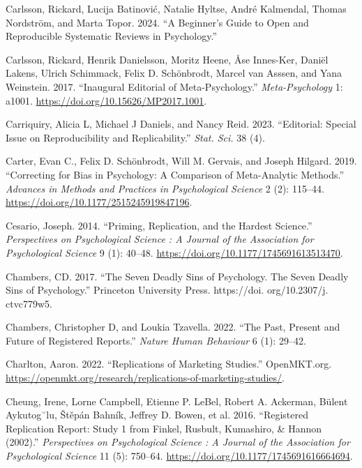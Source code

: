 \documentclass[
  letterpaper,
  DIV=11,
  numbers=noendperiod]{scrreprt}
\newlength{\cslhangindent}
\newenvironment{CSLReferences}[2] %
 {\begin{list}{}{%
  \setlength{\itemindent}{0pt}
  \setlength{\leftmargin}{0pt}
  \setlength{\parsep}{0pt}
  \ifodd #1
   \setlength{\leftmargin}{\cslhangindent}
   \setlength{\itemindent}{-1\cslhangindent}
  \fi
  \setlength{\itemsep}{#2\baselineskip}}}
 {\end{list}}
\begin{document}
\begin{CSLReferences}{1}{0}
Carlsson, Rickard, Lucija Batinović, Natalie Hyltse, André Kalmendal,
Thomas Nordström, and Marta Topor. 2024. {``A Beginner's Guide to Open
and Reproducible Systematic Reviews in Psychology.''}

Carlsson, Rickard, Henrik Danielsson, Moritz Heene, Åse Innes-Ker,
Daniël Lakens, Ulrich Schimmack, Felix D. Schönbrodt, Marcel van Asssen,
and Yana Weinstein. 2017. {``Inaugural Editorial of Meta-Psychology.''}
\emph{Meta-Psychology} 1: a1001.
\url{https://doi.org/10.15626/MP2017.1001}.

Carriquiry, Alicia L, Michael J Daniels, and Nancy Reid. 2023.
{``Editorial: Special Issue on Reproducibility and Replicability.''}
\emph{Stat. Sci.} 38 (4).

Carter, Evan C., Felix D. Schönbrodt, Will M. Gervais, and Joseph
Hilgard. 2019. {``Correcting for Bias in Psychology: A Comparison of
Meta-Analytic Methods.''} \emph{Advances in Methods and Practices in
Psychological Science} 2 (2): 115--44.
\url{https://doi.org/10.1177/2515245919847196}.

Cesario, Joseph. 2014. {``Priming, Replication, and the Hardest
Science.''} \emph{Perspectives on Psychological Science : A Journal of
the Association for Psychological Science} 9 (1): 40--48.
\url{https://doi.org/10.1177/1745691613513470}.

Chambers, CD. 2017. {``The Seven Deadly Sins of Psychology. The Seven
Deadly Sins of Psychology.''} Princeton University Press. https://doi.
org/10.2307/j. ctvc779w5.

Chambers, Christopher D, and Loukia Tzavella. 2022. {``The Past, Present
and Future of Registered Reports.''} \emph{Nature Human Behaviour} 6
(1): 29--42.

Charlton, Aaron. 2022. {``Replications of Marketing Studies.''}
OpenMKT.org.
\url{https://openmkt.org/research/replications-of-marketing-studies/}.

Cheung, Irene, Lorne Campbell, Etienne P. LeBel, Robert A. Ackerman,
Bülent Aykutog˘lu, Štěpán Bahník, Jeffrey D. Bowen, et al. 2016.
{``Registered Replication Report: Study 1 from Finkel, Rusbult,
Kumashiro, {\&} Hannon (2002).''} \emph{Perspectives on Psychological
Science : A Journal of the Association for Psychological Science} 11
(5): 750--64. \url{https://doi.org/10.1177/1745691616664694}.


\end{CSLReferences}
\end{document}
